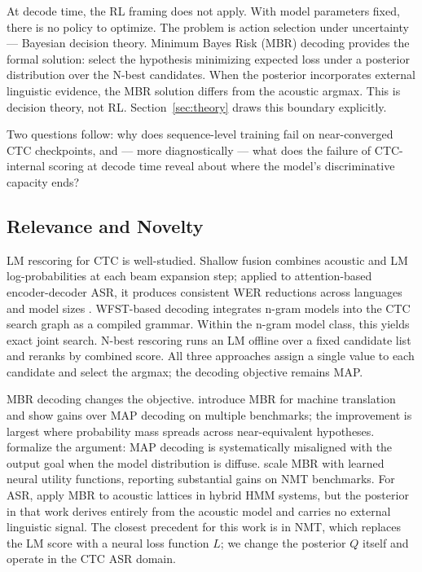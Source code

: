 At decode time, the RL framing does not apply. With model parameters fixed, there is no policy to optimize. The problem is action selection under uncertainty — Bayesian decision theory. Minimum Bayes Risk (MBR) decoding \cite{kumar2004mbr} provides the formal solution: select the hypothesis minimizing expected loss under a posterior distribution over the N-best candidates. When the posterior incorporates external linguistic evidence, the MBR solution differs from the acoustic argmax. This is decision theory, not RL. Section~\ref{sec:theory} draws this boundary explicitly.

Two questions follow: why does sequence-level training fail on near-converged CTC checkpoints, and — more diagnostically — what does the failure of CTC-internal scoring at decode time reveal about where the model's discriminative capacity ends?



\subsection{Relevance and Novelty}

LM rescoring for CTC is well-studied. Shallow fusion \cite{gulcehre2015fusion} combines acoustic and LM log-probabilities at each beam expansion step; applied to attention-based encoder-decoder ASR, it produces consistent WER reductions across languages and model sizes \cite{hori2017advances}. WFST-based decoding \cite{miao2015eesen} integrates n-gram models into the CTC search graph as a compiled grammar. Within the n-gram model class, this yields exact joint search. N-best rescoring \cite{mikolov2010recurrent,shin2019effective} runs an LM offline over a fixed candidate list and reranks by combined score. All three approaches assign a single value to each candidate and select the argmax; the decoding objective remains MAP.

MBR decoding changes the objective. \citet{kumar2004mbr} introduce MBR for machine translation and show gains over MAP decoding on multiple benchmarks; the improvement is largest where probability mass spreads across near-equivalent hypotheses. \citet{eikema2020map} formalize the argument: MAP decoding is systematically misaligned with the output goal when the model distribution is diffuse. \citet{freitag2022high} scale MBR with learned neural utility functions, reporting substantial gains on NMT benchmarks. For ASR, \citet{goel2000mbr} apply MBR to acoustic lattices in hybrid HMM systems, but the posterior in that work derives entirely from the acoustic model and carries no external linguistic signal. The closest precedent for this work is \citet{finkelstein2024mbr} in NMT, which replaces the LM score with a neural loss function $L$; we change the posterior $Q$ itself and operate in the CTC ASR domain.

